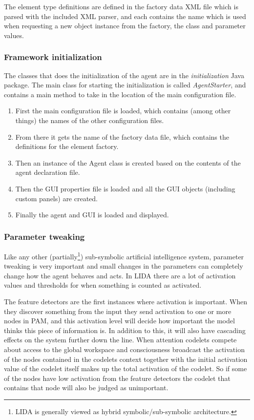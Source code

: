 The element type definitions are defined in the factory data  XML file which is parsed with the included XML parser, and each contains the name which is used when requesting a new object instance from the factory, the class and parameter values.

\subsubsection{Framework initialization}
The classes that does the initialization of the agent are in the {\em initialization} Java package. The main class for starting the initialization is called {\em AgentStarter}, and contains a main method to take in the location of the main configuration file.

\begin{enumerate}
 \item First the main configuration file is loaded, which contains (among other things) the names of the other configuration files.
 \item From there it gets the name of the factory data file, which contains the definitions for the element factory.
 \item Then an instance of the Agent class is created based on the contents of the agent declaration file.
 \item Then the GUI properties file is loaded and all the GUI objects (including custom panels) are created.
 \item Finally the agent and GUI is loaded and displayed.
\end{enumerate}

\subsubsection{Parameter tweaking}
Like any other (partially\footnote{LIDA is generally viewed as hybrid symbolic/sub-symbolic architecture.\cite{duch2008cognitive}}) sub-symbolic artificial intelligence system, parameter tweaking is very important and small changes in the parameters can completely change how the agent behaves and acts. In LIDA there are a lot of activation values and thresholds for when something is counted as activated.

The feature detectors are the first instances where activation is important. When they discover something from the input they send activation to one or more nodes in PAM, and this activation level will decide how important the model thinks this piece of information is. In addition to this, it will also have cascading effects on the system further down the line. When attention codelets compete about access to the global workspace and consciousness broadcast the activation of the nodes contained in the codelets context together with the initial activation value of the codelet itself makes up the total activation of the codelet. So if some of the nodes have low activation from the feature detectors the codelet that contains that node will also be judged as unimportant.

